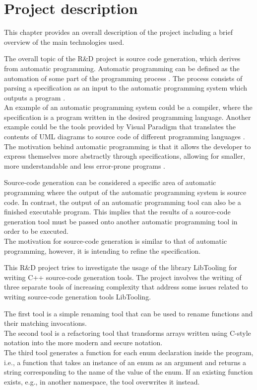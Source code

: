 \chapter{Project description}
This chapter provides an overall description of the project including a brief overview of the main technologies used.

The overall topic of the R\&D project is source code generation, which derives from automatic programming. Automatic programming can be defined as the automation of some part of the programming process \cite{barrAutomaticProgramming1982}. The process consists of parsing a specification as an input to the automatic programming system which outputs a program \cite{novakjr.CS394PAutomatic}.\\
An example of an automatic programming system could be a compiler, where the specification is a program written in the desired programming language. Another example could be the tools provided by Visual Paradigm that translates the contents of UML diagrams to source code of different programming languages \cite{visualparadigmUMLCodeGeneration}.\\
The motivation behind automatic programming is that it allows the developer to express themselves more abstractly through specifications, allowing for smaller, more understandable and less error-prone programs \cite{novakjr.CS394PAutomatic}.

Source-code generation can be considered a specific area of automatic programming where the output of the automatic programming system is source code. In contrast, the output of an automatic programming tool can also be a finished executable program. This implies that the results of a source-code generation tool must be passed onto another automatic programming tool in order to be executed.\\
The motivation for source-code generation is similar to that of automatic programming, however, it is intending to refine the specification.

This R\&D project tries to investigate the usage of the library LibTooling for writing C++ source-code generation tools. The project involves the writing of three separate tools of increasing complexity that address some issues related to writing source-code generation tools LibTooling.

The first tool is a simple renaming tool that can be used to rename functions and their matching invocations.\\
The second tool is a refactoring tool that transforms arrays written using C-style notation into the more modern and secure  notation. \\
The third tool generates a  function for each enum declaration inside the program, i.e., a function that takes an instance of an enum as an argument and returns a string corresponding to the name of the value of the enum. If an existing  function exists, e.g., in another namespace, the tool overwrites it instead.

